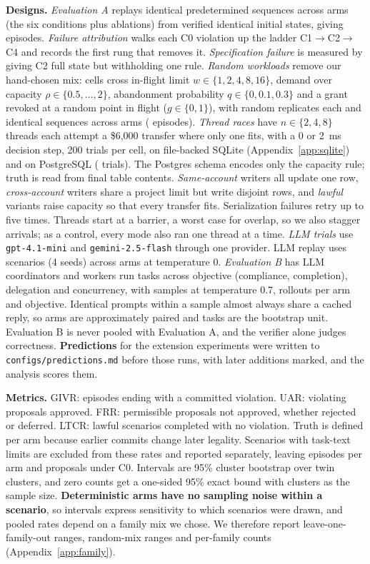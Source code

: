 \documentclass[10pt]{article}
\begin{document}
\textbf{Designs.} \emph{Evaluation A} replays identical predetermined sequences across \nArms{} arms (the six conditions plus ablations) from verified identical initial states, giving \nEpisodes{} episodes. \emph{Failure attribution} walks each C0 violation up the ladder C1$\to$C2$\to$C4 and records the first rung that removes it. \emph{Specification failure} is measured by giving C2 full state but withholding one rule. \emph{Random workloads} remove our hand-chosen mix: \wlCells{} cells cross in-flight limit $w\in\{1,2,4,8,16\}$, demand over capacity $\rho\in\{0.5,\dots,2\}$, abandonment probability $q\in\{0,0.1,0.3\}$ and a grant revoked at a random point in flight ($g\in\{0,1\}$), with \wlReps{} random replicates each and identical sequences across arms (\wlEpisodes{} episodes). \emph{Thread races} have $n\in\{2,4,8\}$ threads each attempt a \$6,000 transfer where only one fits, with a 0 or 2~ms decision step, 200 trials per cell, on file-backed SQLite (Appendix~\ref{app:sqlite}) and on PostgreSQL \pgVersion{} (\pgTrials{} trials). The Postgres schema encodes only the capacity rule; truth is read from final table contents. \emph{Same-account} writers all update one row, \emph{cross-account} writers share a project limit but write disjoint rows, and \emph{lawful} variants raise capacity so that every transfer fits. Serialization failures retry up to five times. Threads start at a barrier, a worst case for overlap, so we also stagger arrivals; as a control, every mode also ran one thread at a time. \emph{LLM trials} use \texttt{gpt-4.1-mini} and \texttt{gemini-2.5-flash} through one provider. LLM replay uses \nLlmFixedScenarios{} scenarios (4 seeds) across \nLlmFixedArms{} arms at temperature 0. \emph{Evaluation B} has LLM coordinators and workers run \nLlmRollTasks{} tasks across objective (compliance, completion), delegation and concurrency, with \nLlmRollSamples{} samples at temperature 0.7, \rlPerCell{} rollouts per arm and objective. Identical prompts within a sample almost always share a cached reply, so arms are approximately paired and tasks are the bootstrap unit. Evaluation B is never pooled with Evaluation A, and the verifier alone judges correctness. \textbf{Predictions} for the extension experiments were written to \texttt{configs/predictions.md} before those runs, with later additions marked, and the analysis scores them.

\textbf{Metrics.} GIVR: episodes ending with a committed violation. UAR: violating proposals approved. FRR: permissible proposals not approved, whether rejected or deferred. LTCR: lawful scenarios completed with no violation. Truth is defined per arm because earlier commits change later legality. Scenarios with task-text limits are excluded from these rates and reported separately, leaving \nInvariantScenarios{} episodes per arm and \nProposals{} proposals under C0. Intervals are 95\% cluster bootstrap over twin clusters, and zero counts get a one-sided 95\% exact bound with clusters as the sample size. \textbf{Deterministic arms have no sampling noise within a scenario}, so intervals express sensitivity to which scenarios were drawn, and pooled rates depend on a family mix we chose. We therefore report leave-one-family-out ranges, random-mix ranges and per-family counts (Appendix~\ref{app:family}).
\end{document}
